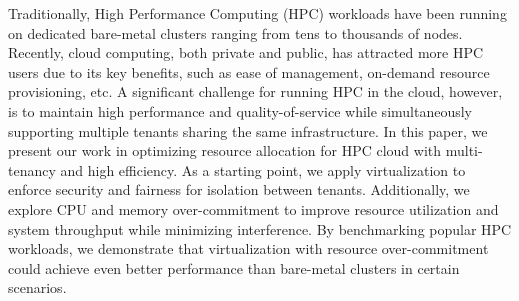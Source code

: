Traditionally, High Performance Computing (HPC) workloads have been running on dedicated bare-metal clusters ranging from tens to thousands of nodes. Recently, cloud computing, both private and public, has attracted more HPC users due to its key benefits, such as ease of management, on-demand resource provisioning, etc. A significant challenge for running HPC in the cloud, however, is to maintain high performance and quality-of-service while simultaneously supporting multiple tenants sharing the same infrastructure. 
In this paper, we present our work in optimizing resource allocation for HPC cloud with 
multi-tenancy and high efficiency. As a starting point, we apply virtualization to 
enforce security and fairness for isolation between tenants. Additionally, 
we explore CPU and memory over-commitment to improve resource utilization and system throughput while minimizing interference.
By benchmarking popular HPC workloads, we demonstrate that virtualization with resource over-commitment could achieve even better performance than bare-metal clusters in certain scenarios. 
